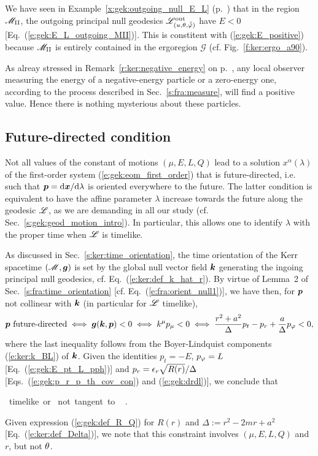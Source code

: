 \begin{example}
We have seen in Example~\ref{x:gek:outgoing_null_E_L} (p.~\pageref{x:gek:outgoing_null_E_L})
that in the region $\mathscr{M}_{\rm II}$, the outgoing principal null geodesics $\mathscr{L}^{\rm out}_{(u,\theta,\tilde{{\tilde\varphi}})}$ have $E<0$ [Eq.~(\ref{e:gek:E_L_outgoing_MII})]. This is constitent with
(\ref{e:gek:E_positive}) because $\mathscr{M}_{\rm II}$ is entirely contained in the ergoregion $\mathscr{G}$
(cf. Fig.~\ref{f:ker:ergo_a90}).
\end{example}

\begin{remark}
As alreay stressed in Remark~\ref{r:ker:negative_energy} on p.~\pageref{r:ker:negative_energy}, any local
observer measuring the energy of a negative-energy particle or a zero-energy one, according to the process described in Sec.~\ref{s:fra:measure}, will
find a positive value. Hence there is nothing mysterious about these particles.
\end{remark}

\subsection{Future-directed condition}

Not all values of the constant of motions $(\mu,E,L,Q)$ lead to a solution
$x^\alpha(\lambda)$ of the first-order system (\ref{e:gek:eom_first_order})
that is future-directed, i.e. such that $\bm{p} = \mathrm{d} \bm{x}/\mathrm{d}\lambda$
is oriented everywhere to the future.
The latter condition is equivalent to have the affine parameter $\lambda$ increase
towards the future along the geodesic $\mathscr{L}$, as we are demanding in all
our study (cf. Sec.~\ref{s:gek:geod_motion_intro}).
In particular, this allows one to identify $\lambda$ with the proper
time when $\mathscr{L}$ is timelike.


As discussed in Sec.~\ref{s:ker:time_orientation}, the time orientation of
the Kerr spacetime $(\mathscr{M},\bm{g})$ is set by the global null
vector field $\bm{k}$ generating the ingoing principal null geodesics, cf. Eq.~(\ref{e:ker:def_k_hat_r}). By virtue of Lemma~2 of Sec.~\ref{s:fra:time_orientation}
[cf. Eq.~(\ref{e:fra:orient_null1})], we have then, for $\bm{p}$ not collinear
with $\bm{k}$ (in particular for $\mathscr{L}$ timelike),
\[
    \bm{p} \ \mbox{future-directed} \iff \bm{g}(\bm{k},\bm{p}) < 0
    \iff k^\mu p_\mu < 0
    \iff \frac{r^2 + a^2}{\Delta} p_t - p_r + \frac{a}{\Delta} p_\varphi < 0 ,
\]
where the last inequality follows from the Boyer-Lindquist components
(\ref{e:ker:k_BL}) of $\bm{k}$.
Given the identities $p_t = -E$, $p_\varphi = L$
[Eq.~(\ref{e:gek:E_pt_L_pph})] and $p_r = \epsilon_r \sqrt{R(r)}/ \Delta $
[Eqs.~(\ref{e:gek:p_r_p_th_cov_con})
and (\ref{e:gek:drdl})], we conclude that
\begin{greybox}
\be \label{e:gek:future_directed}
{\Li \ \mbox{timelike or}\atop
{} \ \mbox{not tangent to} \ \Li} \implies
{} .
\ee
\end{greybox}
Given expression (\ref{e:gek:def_R_Q}) for $R(r)$ and
$\Delta := r^2 - 2m r + a^2$ [Eq.~(\ref{e:ker:def_Delta})],
we note that this constraint involves $(\mu,E,L,Q)$ and $r$, but not $\theta$.

